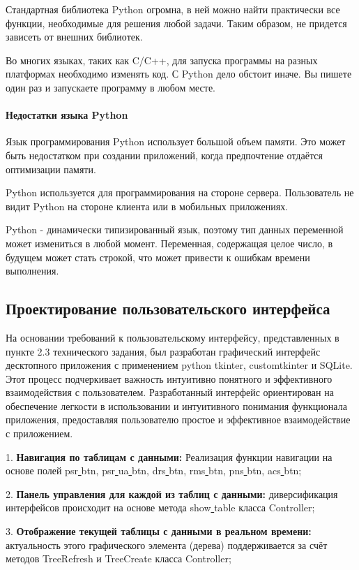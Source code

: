 Стандартная библиотека Python огромна, в ней можно найти практически все функции, необходимые для решения любой задачи. Таким образом, не придется зависеть от внешних библиотек.

Во многих языках, таких как C/C++, для запуска программы на разных платформах необходимо изменять код. С Python дело обстоит иначе. Вы пишете один раз и запускаете программу в любом месте.

\paragraph{Недостатки языка Python}

Язык программирования Python использует большой объем памяти. Это может быть недостатком при создании приложений, когда предпочтение отдаётся оптимизации памяти.

Python используется для программирования на стороне сервера. Пользователь не видит Python на стороне клиента или в мобильных приложениях.

Python - динамически типизированный язык, поэтому тип данных переменной может измениться в любой момент. Переменная, содержащая целое число, в будущем может стать строкой, что может привести к ошибкам времени выполнения.

\subsection{Проектирование пользовательского интерфейса}
На основании требований к пользовательскому интерфейсу, представленных в пункте 2.3 технического задания, был разработан графический интерфейс десктопного приложения с применением python tkinter, customtkinter и SQLite. Этот процесс подчеркивает важность интуитивно понятного и эффективного взаимодействия с пользователем. Разработанный интерфейс ориентирован на обеспечение легкости в использовании и интуитивного понимания функционала приложения, предоставляя пользователю простое и эффективное взаимодействие с приложением.

1. \textbf{Навигация по таблицам с данными:} Реализация функции навигации на основе полей psr\underline{ }btn, psr\underline{ }ua\underline{ }btn, drs\underline{ }btn, rms\underline{ }btn, pns\underline{ }btn, acs\underline{ }btn;

2. \textbf {Панель управления для каждой из таблиц с данными:} диверсификация интерфейсов происходит на основе метода show\underline{ }table класса Controller;

3. \textbf{Отображение текущей таблицы с данными в реальном времени:} актуальность этого графического элемента (дерева) поддерживается за счёт методов TreeRefresh и TreeCreate класса Controller;

